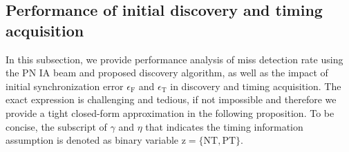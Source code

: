 \documentclass[journal]{IEEEtran}
\newtheorem{proposition}{Proposition}
\newcommand{\CFO}[0]{\epsilon_{\text{F}}}
\newcommand{\STO}[0]{\epsilon_{\text{T}}}
\newcommand{\Nc}[0]{N_{\text{c}}}
\newcommand{\sigman}[0]{\sigma_{\text{n}}}
\newcommand{\Q}[0]{\mathrm{Q}}
\newcommand{\Qinv}[0]{\mathrm{Q}^{-1}}
\newcommand{\SNR}[0]{\mathrm{SNR}}
\begin{document}
% 
%
\subsection{Performance of initial discovery and timing acquisition}
In this subsection, we provide performance analysis of miss detection rate using the PN IA beam and proposed discovery algorithm, 
as well as the impact of initial synchronization error $\CFO$ and $\STO$ in discovery and timing acquisition. The exact expression is challenging and tedious, if not impossible and therefore we provide a tight closed-form approximation in the following proposition. To be concise, the subscript of $\gamma$ and $\eta$ that indicates the timing information assumption is denoted as binary variable $\text{z} = \{\text{NT},\text{PT}\}$.
\end{document}
